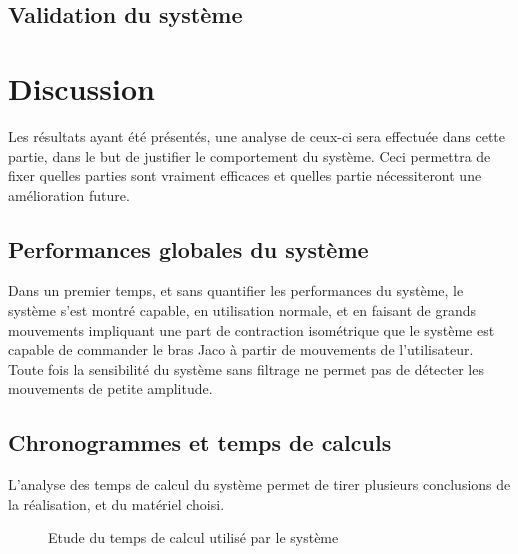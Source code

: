 \documentclass[letterpaper, twoside, 12pt, memoire, creativecommons, hyperref]{thETS}
\begin{document}
\section{Validation du système}

\chapter{Discussion}

Les résultats ayant été présentés, une analyse de ceux-ci sera effectuée dans cette partie, dans le but de justifier le comportement du système. Ceci permettra de fixer quelles parties sont vraiment efficaces et quelles partie nécessiteront une amélioration future.

\section{Performances globales du système}

Dans un premier temps, et sans quantifier les performances du système, le système s'est montré capable, en utilisation normale, et en faisant de grands mouvements impliquant une part de contraction isométrique que le système est capable de commander le bras Jaco à partir de mouvements de l'utilisateur. Toute fois la sensibilité du système sans filtrage ne permet pas de détecter les mouvements de petite amplitude. 

\section{Chronogrammes et temps de calculs}

L'analyse des temps de calcul du système permet de tirer plusieurs conclusions de la réalisation, et du matériel choisi. 

\begin{figure}
	\centering
	\caption{Etude du temps de calcul utilisé par le système}
	\label{fig:chronogrammeDisc}
\end{figure}
\end{document}
